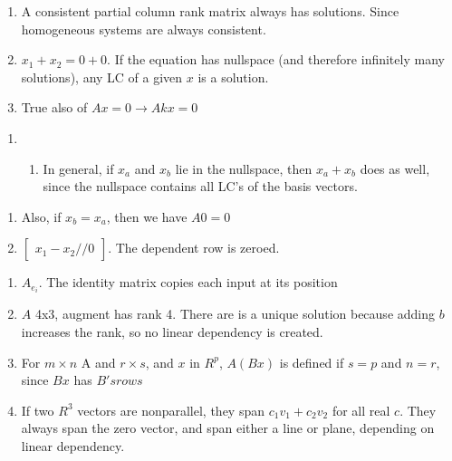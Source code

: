 \documentclass[]{article}
\providecommand{\tightlist}{%
  \setlength{\itemsep}{0pt}\setlength{\parskip}{0pt}}
\begin{document}
\begin{enumerate}
\def\labelenumi{\alph{enumi}.}
\setcounter{enumi}{1}
\item
  A consistent partial column rank matrix always has solutions. Since
  homogeneous systems are always consistent.
\item
  \(x_1+x_2=0+0\). If the equation has nullspace (and therefore
  infinitely many solutions), any LC of a given \(x\) is a solution.
\item
  True also of \(Ax=0\rightarrow{Akx=0}\)
\end{enumerate}

\begin{enumerate}
\def\labelenumi{\arabic{enumi}.}
\setcounter{enumi}{47}
\item
  \begin{enumerate}
  \def\labelenumii{\alph{enumii}.}
  \tightlist
  \item
    In general, if \(x_a\) and \(x_b\) lie in the nullspace, then
    \(x_a+x_b\) does as well, since the nullspace contains all LC's of
    the basis vectors.
  \end{enumerate}
\end{enumerate}

\begin{enumerate}
\def\labelenumi{\alph{enumi}.}
\setcounter{enumi}{1}
\item
  Also, if \(x_b=x_a\), then we have \(A0=0\)
\item
  \(\begin{bmatrix}x_1-x_2//0\end{bmatrix}\). The dependent row is
  zeroed.
\end{enumerate}

\begin{enumerate}
\def\labelenumi{\arabic{enumi}.}
\setcounter{enumi}{34}
\item
  \(A_e_i\). The identity matrix copies each input at its position
\item
  \(A\) 4x3, augment has rank 4. There are is a unique solution because
  adding \(b\) increases the rank, so no linear dependency is created.
\item
  For \(m\times{n}\) A and \(r\times{s}\), and \(x\) in \(R^p\),
  \(A(Bx)\) is defined if \(s =p\) and \(n=r\), since \(Bx\) has
  \(B's rows\)
\item
  If two \(R^3\) vectors are nonparallel, they span \(c_1v_1+c_2v_2\)
  for all real \(c\). They always span the zero vector, and span either
  a line or plane, depending on linear dependency.
\end{enumerate}
\end{document}
